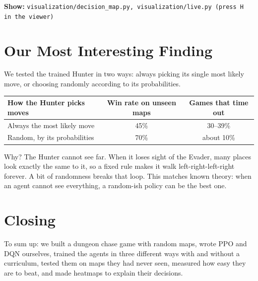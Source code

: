 \documentclass[11pt,a4paper]{article}
\newcommand{\code}[1]{\texttt{#1}}
\newcommand{\showfile}[1]{\par\noindent\textbf{Show:} \code{#1}\par}
\begin{document}
\showfile{visualization/decision\_map.py, visualization/live.py (press H in the viewer)}

\section{Our Most Interesting Finding}
\label{sec:finding}
We tested the trained Hunter in two ways: always picking its single most likely move, or
choosing randomly according to its probabilities.

\begin{center}
\begin{tabular}{lcc}
\toprule
How the Hunter picks moves & Win rate on unseen maps & Games that time out\\
\midrule
Always the most likely move & 45\% & 30--39\%\\
Random, by its probabilities & 70\% & about 10\%\\
\bottomrule
\end{tabular}
\end{center}
Why? The Hunter cannot see far. When it loses sight of the Evader, many places look exactly the
same to it, so a fixed rule makes it walk left-right-left-right forever. A bit of randomness breaks
that loop. This matches known theory: when an agent cannot see everything, a random-ish policy can
be the best one.

\section{Closing}
To sum up: we built a dungeon chase game with random maps, wrote PPO and DQN ourselves, trained the
agents in three different ways with and without a curriculum, tested them on maps they had never
seen, measured how easy they are to beat, and made heatmaps to explain their decisions.

\end{document}
